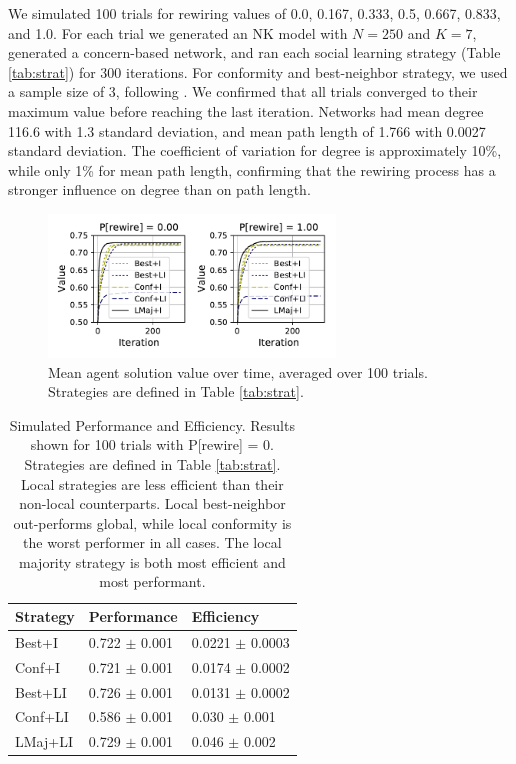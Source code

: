 We simulated 100 trials for rewiring values of 0.0, 0.167, 0.333, 0.5, 0.667, 0.833, and 1.0.
For each trial we generated an NK model with $N=250$ and $K=7$,
generated a concern-based network, and ran each social learning strategy
(Table \ref{tab:strat}) for 300 iterations.
For conformity and best-neighbor strategy, we used a sample size of 3, following
\cite{barkoczi_social_2016}.
We confirmed that all trials converged to their maximum value before reaching
the last iteration.
Networks had mean degree 116.6 with 1.3 standard deviation,
and mean path length of 1.766 with 0.0027 standard deviation.
The coefficient of variation for degree is approximately 10\%,
while only 1\% for mean path length, confirming that the rewiring process has a stronger influence
on degree than on path length.

\begin{figure}[t!]
\centering
\includegraphics[width=3in,height=1.5in]{fig-val-iter.pdf}
\caption{
Mean agent solution value over time, averaged over 100 trials.
Strategies are defined in Table \ref{tab:strat}.
\label{fig:val-iter}
}
\end{figure}

\begin{table}
\small
\centering
\begin{tabular}{lll}
Strategy & Performance & Efficiency\\
\hline
Best+I  & 0.722 $\pm$ 0.001 & 0.0221 $\pm$ 0.0003 \\
Conf+I  & 0.721 $\pm$ 0.001 & 0.0174 $\pm$ 0.0002 \\
Best+LI & 0.726 $\pm$ 0.001 & 0.0131 $\pm$ 0.0002 \\
Conf+LI & 0.586 $\pm$ 0.001 & 0.030 $\pm$ 0.001 \\
LMaj+LI & 0.729 $\pm$ 0.001 & 0.046 $\pm$ 0.002 \\
\hline
\end{tabular}
\caption{
Simulated Performance and Efficiency.
Results shown for 100 trials with P[rewire] = 0.
Strategies are defined in Table \ref{tab:strat}.
Local strategies are less efficient than their non-local counterparts.
Local best-neighbor out-performs global,
while local conformity is the worst performer in all cases.
The local majority strategy is both most efficient and most performant.
\label{tab:sim-eff-perf}
}
\end{table}

